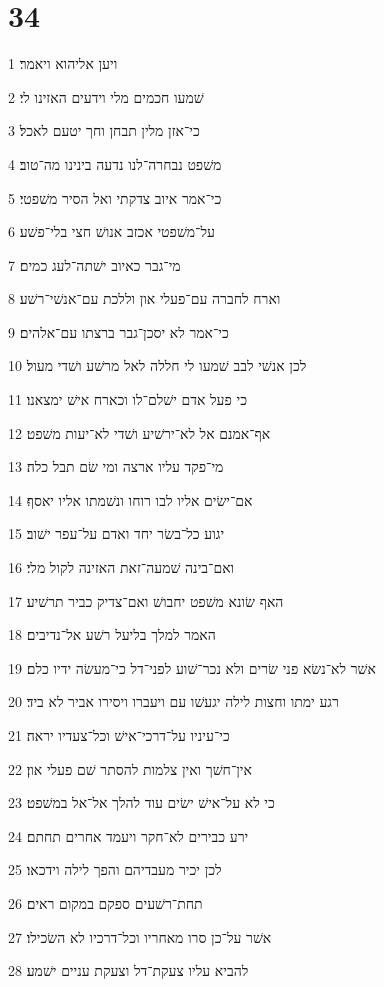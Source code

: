\chapter{34}

\par 1 ויען אליהוא ויאמר׃
\par 2 שׁמעו חכמים מלי וידעים האזינו לי׃
\par 3 כי־אזן מלין תבחן וחך יטעם לאכל׃
\par 4 משׁפט נבחרה־לנו נדעה בינינו מה־טוב׃
\par 5 כי־אמר איוב צדקתי ואל הסיר משׁפטי׃
\par 6 על־משׁפטי אכזב אנושׁ חצי בלי־פשׁע׃
\par 7 מי־גבר כאיוב ישׁתה־לעג כמים׃
\par 8 וארח לחברה עם־פעלי און וללכת עם־אנשׁי־רשׁע׃
\par 9 כי־אמר לא יסכן־גבר ברצתו עם־אלהים׃
\par 10 לכן אנשׁי לבב שׁמעו לי חללה לאל מרשׁע ושׁדי מעול׃
\par 11 כי פעל אדם ישׁלם־לו וכארח אישׁ ימצאנו׃
\par 12 אף־אמנם אל לא־ירשׁיע ושׁדי לא־יעות משׁפט׃
\par 13 מי־פקד עליו ארצה ומי שׂם תבל כלה׃
\par 14 אם־ישׂים אליו לבו רוחו ונשׁמתו אליו יאסף׃
\par 15 יגוע כל־בשׂר יחד ואדם על־עפר ישׁוב׃
\par 16 ואם־בינה שׁמעה־זאת האזינה לקול מלי׃
\par 17 האף שׂונא משׁפט יחבושׁ ואם־צדיק כביר תרשׁיע׃
\par 18 האמר למלך בליעל רשׁע אל־נדיבים׃
\par 19 אשׁר לא־נשׂא פני שׂרים ולא נכר־שׁוע לפני־דל כי־מעשׂה ידיו כלם׃
\par 20 רגע ימתו וחצות לילה יגעשׁו עם ויעברו ויסירו אביר לא ביד׃
\par 21 כי־עיניו על־דרכי־אישׁ וכל־צעדיו יראה׃
\par 22 אין־חשׁך ואין צלמות להסתר שׁם פעלי און׃
\par 23 כי לא על־אישׁ ישׂים עוד להלך אל־אל במשׁפט׃
\par 24 ירע כבירים לא־חקר ויעמד אחרים תחתם׃
\par 25 לכן יכיר מעבדיהם והפך לילה וידכאו׃
\par 26 תחת־רשׁעים ספקם במקום ראים׃
\par 27 אשׁר על־כן סרו מאחריו וכל־דרכיו לא השׂכילו׃
\par 28 להביא עליו צעקת־דל וצעקת עניים ישׁמע׃
